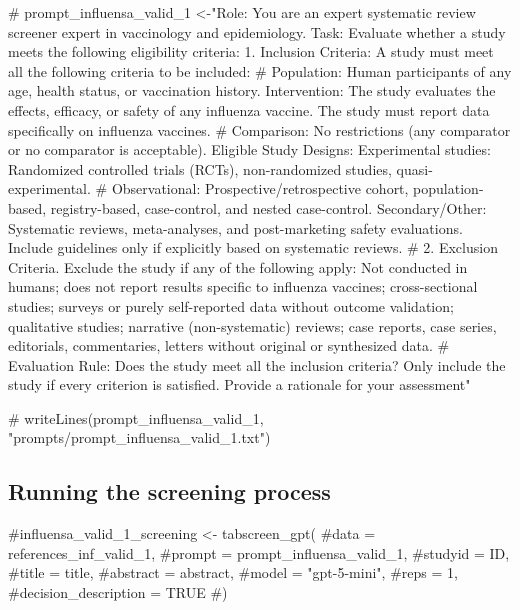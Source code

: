 \documentclass[
  letterpaper,
  DIV=11,
  numbers=noendperiod]{scrartcl}
\newenvironment{Shaded}{\begin{snugshade}}{\end{snugshade}}
\newcommand{\CommentTok}[1]{\textcolor[rgb]{0.37,0.37,0.37}{#1}}
\begin{document}
\begin{Shaded}
\begin{Highlighting}[]
\CommentTok{\# prompt\_influensa\_valid\_1 \textless{}{-}"Role: You are an expert systematic review screener expert in vaccinology and epidemiology. Task: Evaluate whether a study meets the following eligibility criteria: 1. Inclusion Criteria: A study must meet all the following criteria to be included:}
\CommentTok{\# Population: Human participants of any age, health status, or vaccination history. Intervention: The study evaluates the effects, efficacy, or safety of any influenza vaccine. The study must report data specifically on influenza vaccines.}
\CommentTok{\# Comparison: No restrictions (any comparator or no comparator is acceptable). Eligible Study Designs: Experimental studies: Randomized controlled trials (RCTs), non{-}randomized studies, quasi{-}experimental.}
\CommentTok{\# Observational: Prospective/retrospective cohort, population{-}based, registry{-}based, case{-}control, and nested case{-}control. Secondary/Other: Systematic reviews, meta{-}analyses, and post{-}marketing safety evaluations. Include guidelines only if explicitly based on systematic reviews. }
\CommentTok{\# 2. Exclusion Criteria. Exclude the study if any of the following apply: Not conducted in humans; does not report results specific to influenza vaccines; cross{-}sectional studies; surveys or purely self{-}reported data without outcome validation;  qualitative studies; narrative (non{-}systematic) reviews; case reports, case series, editorials, commentaries, letters without original or synthesized data.}
\CommentTok{\# Evaluation Rule: Does the study meet all the inclusion criteria? Only include the study if every criterion is satisfied. Provide a rationale for your assessment"}

\CommentTok{\# writeLines(prompt\_influensa\_valid\_1, "prompts/prompt\_influensa\_valid\_1.txt")}
\end{Highlighting}
\end{Shaded}

\subsection{Running the screening
process}\label{running-the-screening-process}

\begin{Shaded}
\begin{Highlighting}[]
\CommentTok{\#influensa\_valid\_1\_screening \textless{}{-}  tabscreen\_gpt(}
  \CommentTok{\#data = references\_inf\_valid\_1,}
  \CommentTok{\#prompt = prompt\_influensa\_valid\_1,}
  \CommentTok{\#studyid = ID,}
  \CommentTok{\#title = title,}
  \CommentTok{\#abstract = abstract,}
  \CommentTok{\#model = "gpt{-}5{-}mini",}
  \CommentTok{\#reps = 1,}
  \CommentTok{\#decision\_description = TRUE}
\CommentTok{\#)}
\end{Highlighting}
\end{Shaded}
\end{document}
